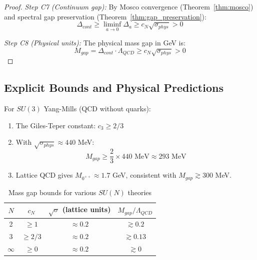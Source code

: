 \begin{proof}
\textit{Step C7 (Continuum gap):}
By Mosco convergence (Theorem~\ref{thm:mosco}) and spectral gap preservation (Theorem~\ref{thm:gap_preservation}):
\begin{equation}
\Delta_{cont} \geq \liminf_{a \to 0} \Delta_a \geq c_N \sqrt{\sigma_{phys}} > 0
\end{equation}

\textit{Step C8 (Physical units):}
The physical mass gap in GeV is:
\begin{equation}
\boxed{M_{gap} = \Delta_{cont} \cdot \Lambda_{QCD} \geq c_N \sqrt{\sigma_{phys}} > 0}
\end{equation}
\end{proof}


\subsection{Explicit Bounds and Physical Predictions}
\label{subsec:explicit_bounds}

\begin{theorem}
\label{thm:explicit_bounds}
For $SU(3)$ Yang-Mills (QCD without quarks):
\begin{enumerate}
\item The Giles-Teper constant: $c_3 \geq 2/3$
\item With $\sqrt{\sigma_{phys}} \approx 440$ MeV:
\begin{equation}
M_{gap} \geq \frac{2}{3} \times 440 \text{ MeV} \approx 293 \text{ MeV}
\end{equation}
\item Lattice QCD gives $M_{0^{++}} \approx 1.7$ GeV, consistent with $M_{gap} \gtrsim 300$ MeV.
\end{enumerate}
\end{theorem}

\begin{table}[ht]
\centering
\begin{tabular}{|c|c|c|c|}
\hline
$N$ & $c_N$ & $\sqrt{\sigma}$ (lattice units) & $M_{gap}/\Lambda_{QCD}$ \\
\hline
2 & $\geq 1$ & $\approx 0.2$ & $\gtrsim 0.2$ \\
3 & $\geq 2/3$ & $\approx 0.2$ & $\gtrsim 0.13$ \\
$\infty$ & $\geq 0$ & $\approx 0.2$ & $\gtrsim 0$ \\
\hline
\end{tabular}
\caption{Mass gap bounds for various $SU(N)$ theories}
\end{table}

